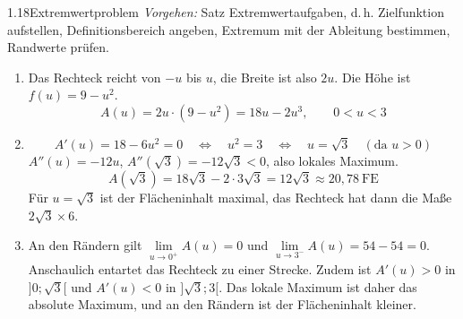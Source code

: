 \begin{loesung}{1.18}{Extremwertproblem}
\textit{Vorgehen:} Satz \glqq Extremwertaufgaben\grqq, d.\,h. Zielfunktion aufstellen, Definitionsbereich angeben, Extremum mit der Ableitung bestimmen, Randwerte prüfen.
\begin{enumerate}[label=\alph*)]
  \item Das Rechteck reicht von $-u$ bis $u$, die Breite ist also $2u$. Die Höhe ist $f(u)=9-u^2$.
  \[A(u) = 2u\cdot(9-u^2) = 18u-2u^3,\qquad 0<u<3\]
  \item \[A'(u) = 18-6u^2 = 0 \quad\Longleftrightarrow\quad u^2 = 3 \quad\Longleftrightarrow\quad u = \sqrt{3}\quad(\text{da } u>0)\]
  $A''(u) = -12u$, $A''(\sqrt{3}) = -12\sqrt{3} < 0$, also lokales Maximum.
  \[A(\sqrt{3}) = 18\sqrt{3}-2\cdot 3\sqrt{3} = 12\sqrt{3}\approx 20{,}78\ \text{FE}\]
  Für $u=\sqrt{3}$ ist der Flächeninhalt maximal, das Rechteck hat dann die Maße $2\sqrt{3}\times 6$.
  \item An den Rändern gilt $\lim\limits_{u\longrightarrow 0^+}A(u) = 0$ und $\lim\limits_{u\longrightarrow 3^-}A(u) = 54-54 = 0$. Anschaulich entartet das Rechteck zu einer Strecke. Zudem ist $A'(u)>0$ in $]0;\sqrt{3}[$ und $A'(u)<0$ in $]\sqrt{3};3[$. Das lokale Maximum ist daher das absolute Maximum, und an den Rändern ist der Flächeninhalt kleiner.
\end{enumerate}
\end{loesung}


